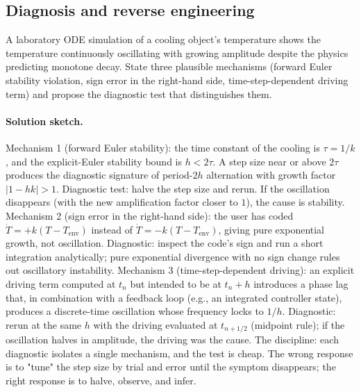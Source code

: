 \subsection*{Diagnosis and reverse engineering}

\begin{exercise}
A laboratory ODE simulation of a cooling object's temperature
shows the temperature continuously oscillating with growing
amplitude despite the physics predicting monotone decay. State
three plausible mechanisms (forward Euler stability violation,
sign error in the right-hand side, time-step-dependent driving
term) and propose the diagnostic test that distinguishes them.

\paragraph{Solution sketch.} Mechanism 1 (forward Euler
stability): the time constant of the cooling is $\tau = 1/k$,
and the explicit-Euler stability bound is $h < 2 \tau$. A step
size near or above $2 \tau$ produces the diagnostic signature of
period-$2 h$ alternation with growth factor $|1 - h k| > 1$.
Diagnostic test: halve the step size and rerun. If the
oscillation disappears (with the new amplification factor closer
to $1$), the cause is stability. Mechanism 2 (sign error in the
right-hand side): the user has coded $\dot{T} = +k(T - T_{\text
{env}})$ instead of $\dot{T} = -k(T - T_{\text{env}})$, giving
pure exponential growth, not oscillation. Diagnostic: inspect
the code's sign and run a short integration analytically; pure
exponential divergence with no sign change rules out
oscillatory instability. Mechanism 3 (time-step-dependent
driving): an explicit driving term computed at $t_{n}$ but
intended to be at $t_{n} + h$ introduces a phase lag that, in
combination with a feedback loop (e.g., an integrated controller
state), produces a discrete-time oscillation whose frequency
locks to $1/h$. Diagnostic: rerun at the same $h$ with the
driving evaluated at $t_{n + 1/2}$ (midpoint rule); if the
oscillation halves in amplitude, the driving was the cause. The
discipline: each diagnostic isolates a single mechanism, and the
test is cheap. The wrong response is to "tune" the step size by
trial and error until the symptom disappears; the right response
is to halve, observe, and infer.
\end{exercise}

